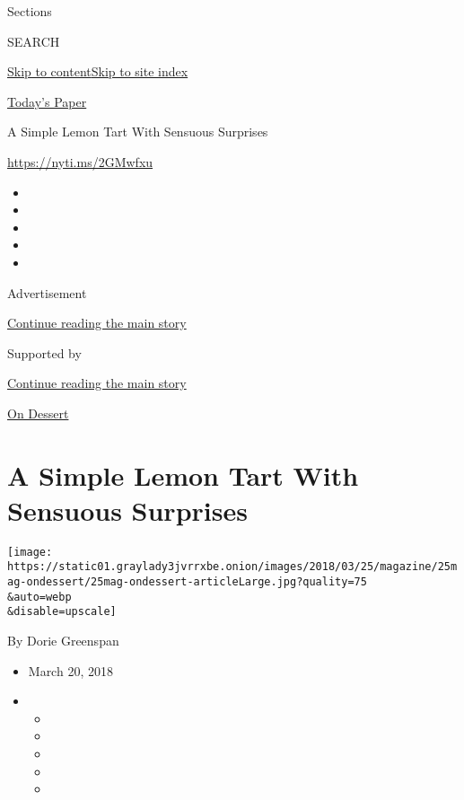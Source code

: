 Sections

SEARCH

\protect\hyperlink{site-content}{Skip to
content}\protect\hyperlink{site-index}{Skip to site index}

\href{https://myaccount.nytimes3xbfgragh.onion/auth/login?response_type=cookie\&client_id=vi}{}

\href{https://www.nytimes3xbfgragh.onion/section/todayspaper}{Today's
Paper}

A Simple Lemon Tart With Sensuous Surprises

\url{https://nyti.ms/2GMwfxu}

\begin{itemize}
\item
\item
\item
\item
\item
\end{itemize}

Advertisement

\protect\hyperlink{after-top}{Continue reading the main story}

Supported by

\protect\hyperlink{after-sponsor}{Continue reading the main story}

\href{/column/on-dessert}{On Dessert}

\hypertarget{a-simple-lemon-tart-with-sensuous-surprises}{%
\section{A Simple Lemon Tart With Sensuous
Surprises}\label{a-simple-lemon-tart-with-sensuous-surprises}}

\texttt{[image: https://static01.graylady3jvrrxbe.onion/images/2018/03/25/magazine/25mag-ondessert/25mag-ondessert-articleLarge.jpg?quality=75\\\&auto=webp\\\&disable=upscale]}

By Dorie Greenspan

\begin{itemize}
\item
  March 20, 2018
\item
  \begin{itemize}
  \item
  \item
  \item
  \item
  \item
  \end{itemize}
\end{itemize}

